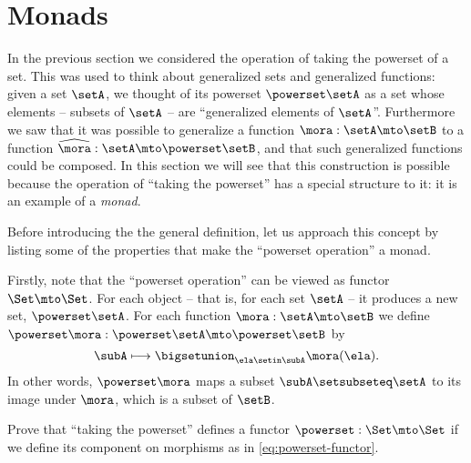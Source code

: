 
\section{Monads}
\label{sec:monads}

In the previous section we considered the operation of taking the powerset of a set.
This was used to think about generalized sets and generalized functions: given a set $\setA$, we thought of its powerset $\powerset \setA$ as a set whose elements -- subsets of $\setA$ -- are ``generalized elements of $\setA$''.
Furthermore we saw that it was possible to generalize a function $\mora : \setA \mto \setB$ to a function $\widehat \mora:  \setA \mto \powerset \setB$, and that such generalized functions could be composed.
In this section we will see that this construction is possible because the operation of ``taking the powerset'' has a special structure to it: it is an example of a \emph{monad}.

Before introducing the the general definition, let us approach this concept by listing some of the properties that make the ``powerset operation'' a monad.

Firstly, note that the ``powerset operation'' can be viewed as functor $\Set \mto \Set$.
For each object -- that is, for each set $\setA$ -- it produces a new set, $\powerset \setA$.
For each function $\mora: \setA \mto \setB$ we define $\powerset \mora : \powerset \setA \mto \powerset \setB$ by
\begin{equation}
    \label{eq:powerset-functor}
    \subA \longmapsto \bigsetunion_{\ela \setin \subA} \mora(\ela).
\end{equation}
In other words, $\powerset \mora$ maps a subset $\subA \setsubseteq \setA$ to its image under $\mora$, which is a subset of $\setB$.

\begin{gradedexercise}
    \label{ex:PowersetImageFunctor}
    Prove that ``taking the powerset'' defines a functor $\powerset : \Set \mto \Set$ if we define its component on morphisms as in \cref{eq:powerset-functor}.
\end{gradedexercise}


